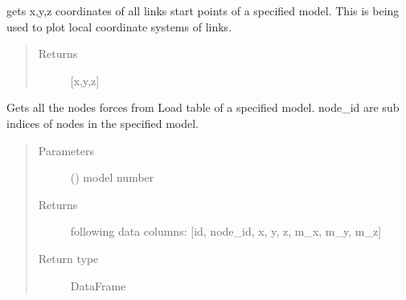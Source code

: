 \documentclass[letterpaper,10pt,english]{sphinxmanual}
\begin{document}
\begin{fulllineitems}
\begin{fulllineitems}
\label{\detokenize{api:beamon.database.database.Database.get_links_starting_points}}
gets x,y,z coordinates of all links start points of a specified model.
This is being used to plot local coordinate systems of links.
\begin{quote}\begin{description}
\item[{Returns}] \leavevmode
{[}x,y,z{]}

\end{description}\end{quote}

\end{fulllineitems}


\begin{fulllineitems}
\label{\detokenize{api:beamon.database.database.Database.get_loads}}
Gets all the nodes forces from Load table of a specified model.
node\_id are sub indices of nodes in the specified model.
\begin{quote}\begin{description}
\item[{Parameters}] \leavevmode
{} () \textendash{} model number

\item[{Returns}] \leavevmode
following data columns: {[}id, node\_id, x, y, z, m\_x, m\_y, m\_z{]}

\item[{Return type}] \leavevmode
DataFrame

\end{description}\end{quote}

\end{fulllineitems}



\end{fulllineitems}
\end{document}
